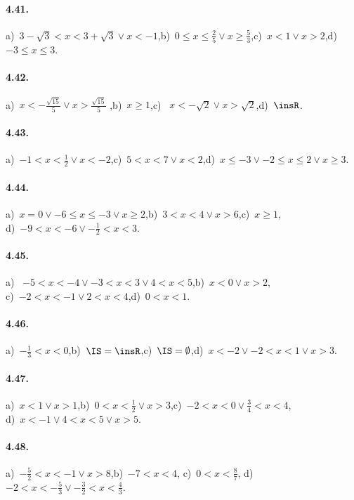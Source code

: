 \paragraph{4.41.} a)~$3-\sqrt 3<x<3+\sqrt 3\vee x<-1$,\quad b)~$0\le x\le \frac 2 5\vee x\ge \frac 5 3$,\quad c)~$x<1\vee x>2$,\quad d)~$-3\le x\le 3$.

\paragraph{4.42.} a)~$x<-\frac{\sqrt{15}} 5\vee x>\frac{\sqrt{15}} 5$ ,\quad b)~$x\ge 1$,\quad c)~ $x<-\sqrt 2\vee x>\sqrt 2$,\quad d)~$\insR$.

\paragraph{4.43.} a)~$-1<x<\frac 1 2\vee x<-2$,\quad c)~$5<x<7\vee x<2$,\quad d)~$x\le -3\vee -2\le x\le 2\vee x\ge 3$.

\paragraph{4.44.} a)~$x=0\vee -6\le x\le -3\vee x\ge 2$,\quad b)~$3<x<4\vee x>6$,\quad c)~$x\ge 1$,\protect\\
d)~$-9<x<-6\vee -\frac 1 2<x<3$.

\paragraph{4.45.} a)~ $-5<x<-4\vee -3<x<3\vee 4<x<5$,\quad b)~$x<0\vee x>2$,\protect\\
c)~$-2<x<-1\vee 2<x<4$,\quad d)~$0<x<1$.

\paragraph{4.46.} a)~$-\frac 1 3<x<0$,\quad b)~$\IS=\insR$,\quad c)~$\IS=\emptyset $,\quad d)~$x<-2\vee -2<x<1\vee x>3$.

\paragraph{4.47.} a)~$x<1\vee x>1$,\quad b)~$0<x<\frac 1 2\vee x>3$,\quad c)~$-2<x<0\vee \frac 3 4<x<4$,\protect\\
d)~$x<-1\vee 4<x<5\vee x>5$.

\paragraph{4.48.} a)~$-\frac 5 2<x<-1\vee x>8$,\quad b)~$-7<x<4$,\; c)~$0<x<\frac 8 7$,\; d)~$-2<x<-\frac 5 3\vee -\frac 3 2<x<\frac 4 3$.


